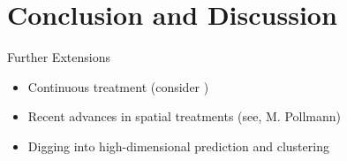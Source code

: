\section{Conclusion and Discussion}

\begin{frame}{Further Extensions}
\begin{itemize}
    \item Continuous treatment (consider \cite{callawayetal2021})
    \item Recent advances in spatial treatments (see, M. Pollmann)
    \item Digging into high-dimensional prediction and clustering
\end{itemize}
\end{frame}
